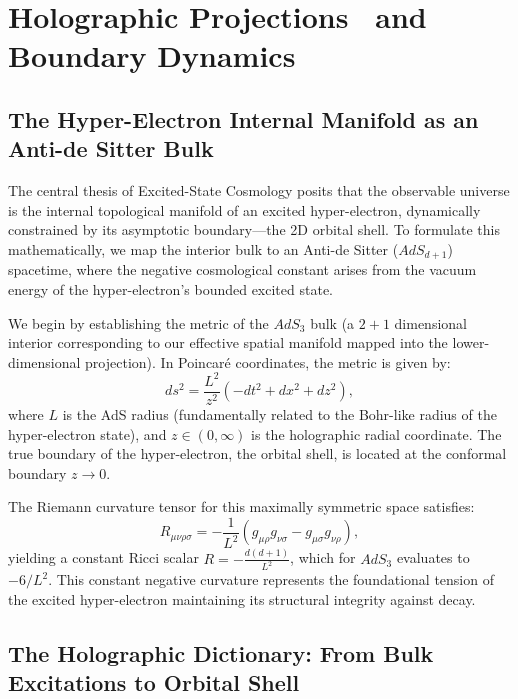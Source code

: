 \section{Holographic Projections~\cite{Susskind1995} and Boundary Dynamics}

\subsection{The Hyper-Electron Internal Manifold as an Anti-de Sitter Bulk}

The central thesis of Excited-State Cosmology posits that the observable universe is the internal topological manifold of an excited hyper-electron, dynamically constrained by its asymptotic boundary—the 2D orbital shell. To formulate this mathematically, we map the interior bulk to an Anti-de Sitter ($AdS_{d+1}$) spacetime, where the negative cosmological constant arises from the vacuum energy of the hyper-electron's bounded excited state. \cite{Peebles1970, Harrison1970, Mukhanov1981}

We begin by establishing the metric of the $AdS_3$ bulk (a $2+1$ dimensional interior corresponding to our effective spatial manifold mapped into the lower-dimensional projection). In Poincaré coordinates, the metric is given by:
\begin{equation}
    ds^2 = \frac{L^2}{z^2} \left( -dt^2 + dx^2 + dz^2 \right),
\end{equation}
where $L$ is the AdS radius (fundamentally related to the Bohr-like radius of the hyper-electron state), and $z \in (0, \infty)$ is the holographic radial coordinate. The true boundary of the hyper-electron, the orbital shell, is located at the conformal boundary $z \to 0$.

The Riemann curvature tensor for this maximally symmetric space satisfies:
\begin{equation}
    R_{\mu\nu\rho\sigma} = -\frac{1}{L^2} \left( g_{\mu\rho} g_{\nu\sigma} - g_{\mu\sigma} g_{\nu\rho} \right),
\end{equation}
yielding a constant Ricci scalar $R = -\frac{d(d+1)}{L^2}$, which for $AdS_3$ evaluates to $-6/L^2$. This constant negative curvature represents the foundational tension of the excited hyper-electron maintaining its structural integrity against decay.

\subsection{The Holographic Dictionary: From Bulk Excitations to Orbital Shell}

